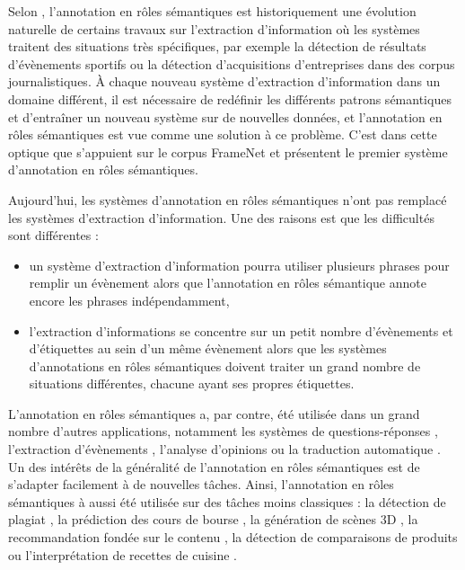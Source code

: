 Selon \cite{gildea2002automatic}, l'annotation en rôles sémantiques est
historiquement une évolution naturelle de certains travaux sur l'extraction
d'information où les systèmes traitent des situations très spécifiques, par
exemple la détection de résultats d'évènements sportifs ou la détection
d'acquisitions d'entreprises dans des corpus journalistiques. À chaque nouveau
système d'extraction d'information dans un domaine différent, il est nécessaire
de redéfinir les différents patrons sémantiques et d'entraîner un nouveau
système sur de nouvelles données, et l'annotation en rôles sémantiques est vue
comme une solution à ce problème. C'est dans cette optique que
\cite{gildea2002automatic} s'appuient sur le corpus FrameNet et présentent le
premier système d'annotation en rôles sémantiques.

Aujourd'hui, les systèmes d'annotation en rôles sémantiques n'ont pas remplacé
les systèmes d'extraction d'information. Une des raisons est que les
difficultés sont différentes \citep{boros2014etiquetage} :

\begin{itemize}
    \item un système d'extraction d'information pourra utiliser plusieurs
        phrases pour remplir un évènement alors que l'annotation en rôles
        sémantique annote encore les phrases indépendamment,
    \item l'extraction d'informations se concentre sur un petit nombre
        d'évènements et d'étiquettes au sein d'un même évènement alors que les
        systèmes d'annotations en rôles sémantiques doivent traiter un grand
        nombre de situations différentes, chacune ayant ses propres étiquettes.
\end{itemize}

L'annotation en rôles sémantiques a, par contre, été utilisée dans un grand
nombre d'autres applications, notamment les systèmes de questions-réponses
\citep{shen2007using}, l'extraction d'évènements \citep{exner2011using},
l'analyse d'opinions \citep{das2012structure} ou la traduction automatique
\citep{bazrafshan2013semantic,bazrafshan2014comparing}. Un des intérêts de la
généralité de l'annotation en rôles sémantiques est de s'adapter facilement à
de nouvelles tâches. Ainsi, l'annotation en rôles sémantiques à aussi été
utilisée sur des tâches moins classiques : la détection de plagiat
\citep{osman2012improved}, la prédiction des cours de bourse
\citep{xie2013semantic}, la génération de scènes 3D \citep{chang2014learning},
la recommandation fondée sur le contenu \citep{de2014exploiting}, la détection
de comparaisons de produits \citep{kessler2013detection} ou l'interprétation de
recettes de cuisine \citep{malmaud2014cooking}.

